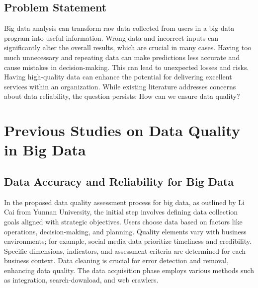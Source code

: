 \documentclass[10pt,a4paper]{article}
\begin{document}
\subsection{Problem Statement}

Big data analysis can transform raw data collected from users in a big data program into useful information. Wrong data and incorrect inputs can significantly alter the overall results, which are crucial in many cases.\cite{8063921} Having too much unnecessary and repeating data can make predictions less accurate and cause mistakes in decision-making. This can lead to unexpected losses and risks.\cite{10165495} Having high-quality data can enhance the potential for delivering excellent services within an organization.\cite{6204995} While existing literature addresses concerns about data reliability, the question persists: How can we ensure data quality?

\section{Previous Studies on Data Quality in Big Data}

\subsection{Data Accuracy and Reliability for Big Data}
In the proposed data quality assessment process for big data, as outlined by Li Cai from Yunnan University, the initial step involves defining data collection goals aligned with strategic objectives. Users choose data based on factors like operations, decision-making, and planning. Quality elements vary with business environments; for example, social media data prioritize timeliness and credibility.\cite{article}
Specific dimensions, indicators, and assessment criteria are determined for each business context. Data cleaning is crucial for error detection and removal, enhancing data quality. The data acquisition phase employs various methods such as integration, search-download, and web crawlers.\cite{article}

\newpage
\end{document}
